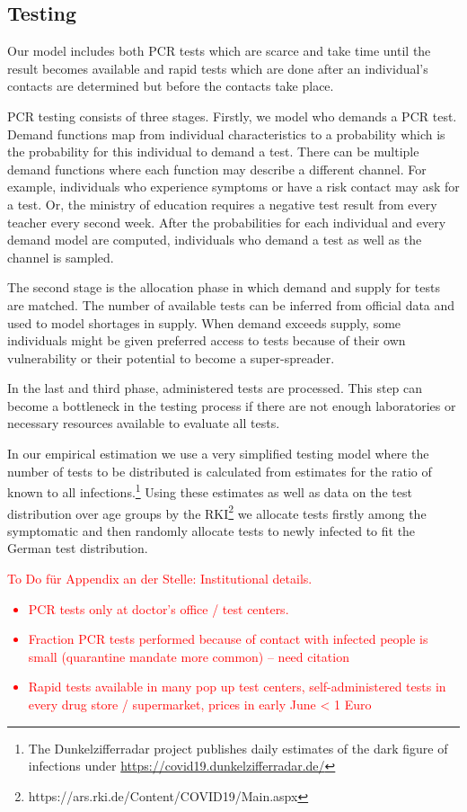 \subsection{Testing} %
\label{sub:testing}

Our model includes both PCR tests which are scarce and take time until the result becomes
available and rapid tests which are done after an individual's contacts are determined
but before the contacts take place.

PCR testing consists of three stages. Firstly, we model who demands a PCR test. Demand
functions map from individual characteristics to a probability which is the probability
for this individual to demand a test. There can be multiple demand functions where each
function may describe a different channel. For example, individuals who experience
symptoms or have a risk contact may ask for a test. Or, the ministry of education
requires a negative test result from every teacher every second week. After the
probabilities for each individual and every demand model are computed, individuals who
demand a test as well as the channel is sampled.

The second stage is the allocation phase in which demand and supply for tests are
matched. The number of available tests can be inferred from official data and used to
model shortages in supply. When demand exceeds supply, some individuals might be given
preferred access to tests because of their own vulnerability or their potential to
become a super-spreader.

In the last and third phase, administered tests are processed. This step can become a
bottleneck in the testing process if there are not enough laboratories or necessary
resources available to evaluate all tests.

In our empirical estimation we use a very simplified testing model where the number of
tests to be distributed is calculated from estimates for the ratio of known to all
infections.\footnote{The Dunkelzifferradar project publishes daily estimates of the dark
figure of infections under \url{https://covid19.dunkelzifferradar.de/}} Using these
estimates as well as data on the test distribution over age groups by the
RKI\footnote{https://ars.rki.de/Content/COVID19/Main.aspx} we allocate tests firstly
among the symptomatic and then randomly allocate tests to newly infected to fit the
German test distribution.

\textcolor{red}{

To Do für Appendix an der Stelle: Institutional details.

\begin{itemize}
    \item PCR tests only at doctor's office / test centers.
    \item Fraction PCR tests performed because of contact with infected people is small (quarantine mandate more common) -- need citation
    \item Rapid tests available in many pop up test centers, self-administered tests in every  drug store / supermarket, prices in early June < 1 Euro
\end{itemize}
}

